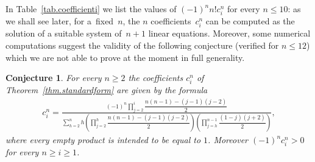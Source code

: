 \documentclass[pdftex]{sigma}
\numberwithin{equation}{section}
\newtheorem{Conjecture}[Theorem]{Conjecture}
\begin{document}
In Table~\ref{tab.coefficienti} we list the values of $(-1)^{n}n! c^n_i$ for every $n\le 10$:
as we shall see later, for a~f\/ixed~$n$, the $n$ coef\/f\/icients~$c_i^n$ can be computed as the solution of a suitable system of~$n+1$ linear equations. Moreover, some numerical computations suggest the validity of the following conjecture (verif\/ied for $n\le 12$) which we are not able to prove at the moment in full generality.

\begin{Conjecture} For every $n\ge 2$ the coefficients $c^n_i$ of Theorem~{\rm \ref{thm.standardform}} are given by the formula
\begin{gather*}
c_i^n=\frac{\displaystyle (-1)^{n} \prod_{j=2}^{i}\dfrac{n(n-1)-(j-1)(j-2)}{2}}
{\displaystyle \sum_{h=2}^n h\left(\prod_{j=2}^{h}\dfrac{n(n-1)-(j-1)(j-2)}{2}\right)\left(\prod_{j=h}^{n-1}\dfrac{(1-j)(j+2)}{2}\right)} ,
\end{gather*}
where every empty product is intended to be equal to $1$. Moreover $(-1)^{n}c^n_i>0$ for every $n\ge i\ge 1$.
\end{Conjecture}
\end{document}
